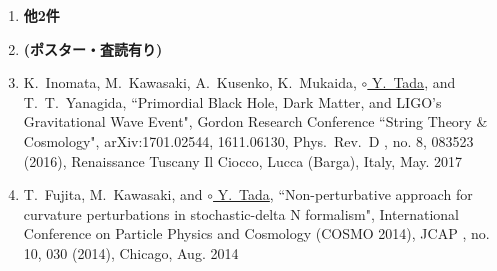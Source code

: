 \documentclass[11pt,a4paper,twoside]{jarticle}
\renewcommand{\emph}[1]{{\sffamily\gtfamily\bfseries #1}}
\renewcommand{\bf}{\bfseries\sffamily\gtfamily}
\newcommand{\研究課題名}{\mgfamily\sffamily インフレーション宇宙における曲率ゆらぎと原始ブラックホール形成}
\newcommand{\研究機関名}{\mgfamily\sffamily Institut d'Astrophysique de Paris}
\newcommand{\申請者氏名}{\mgfamily\sffamily 多田祐一郎}
\newcommand{\研究代表者氏名}{\申請者氏名}
\newcommand{\研究期間の最終元号年度}{32}	%
\begin{document}
{\begin{enumerate}
		\item[] \emph{他2件}
			
		\item[]\emph{\small (ポスター・査読有り)}	
		\item K.~Inomata, M.~Kawasaki, A.~Kusenko, K.~Mukaida, \underline{$\circ$ Y.~Tada}, and T.~T.~Yanagida,
			``Primordial Black Hole, Dark Matter, and LIGO's Gravitational Wave Event",
			Gordon Research Conference ``String Theory \& Cosmology",
			arXiv:1701.02544, 1611.06130, Phys.\ Rev.\ D {\bf 94}, no. 8, 083523 (2016),
			Renaissance Tuscany Il Ciocco, Lucca (Barga), Italy,
			May. 2017
		
		\item T.~Fujita, M.~Kawasaki, and \underline{$\circ$ Y.~Tada},
			``Non-perturbative approach for curvature perturbations in stochastic-delta N formalism",
			International Conference on Particle Physics and Cosmology (COSMO 2014), 
			JCAP {\bf 1410}, no. 10, 030 (2014),
			Chicago,
			Aug. 2014
			

		
			
			
		
	\end{enumerate}
	\vspace{-3pt}
	\hspace{10pt}\emph{その他, 研究機関におけるセミナー発表5件}
	\vspace{5pt}
}
\end{document}
